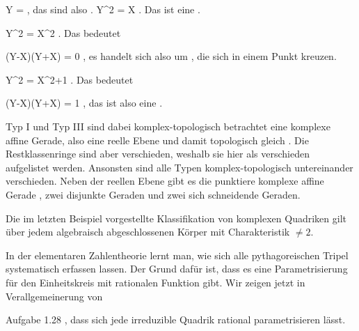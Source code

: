 {{\mavergleichskette
{\vergleichskette
{ Y
}
{ = }{ 
}
{  }{
}
{    }{
}
{   }{
}
}
{}{}{,}
das sind also  {.}
}{
\mavergleichskette
{\vergleichskette
{ Y^2
}
{ = }{ X
}
{  }{
}
{    }{
}
{   }{
}
}
{}{}{.}
Das ist eine  {.}
}{
\mavergleichskette
{\vergleichskette
{ Y^2
}
{ = }{ X^2
}
{  }{
}
{    }{
}
{   }{
}
}
{}{}{.}
Das bedeutet

\mavergleichskette
{\vergleichskette
{ (Y-X)(Y+X)
}
{ = }{ 0
}
{  }{
}
{    }{
}
{   }{
}
}
{}{}{,}
es handelt sich also um  {,} die sich in einem Punkt kreuzen.
}{
\mavergleichskette
{\vergleichskette
{ Y^2
}
{ = }{ X^2+1
}
{  }{
}
{    }{
}
{   }{
}
}
{}{}{.}
Das bedeutet

\mavergleichskette
{\vergleichskette
{ (Y-X)(Y+X)
}
{ = }{ 1
}
{  }{
}
{    }{
}
{   }{
}
}
{}{}{,}
das ist also eine  {.}
}
Typ I und Typ III sind dabei komplex-topologisch betrachtet eine komplexe affine Gerade, also eine reelle Ebene und damit topologisch gleich
 {} {.}
Die Restklassenringe sind aber verschieden, weshalb sie hier als verschieden aufgelistet werden. Ansonsten sind alle Typen komplex-topologisch untereinander verschieden. Neben der reellen Ebene gibt es die punktiere komplexe affine Gerade
 {} {,}
zwei disjunkte Geraden und zwei sich
 {} {}
schneidende Geraden.





}

Die im letzten Beispiel vorgestellte Klassifikation von komplexen Quadriken gilt über jedem algebraisch abgeschlossenen Körper mit Charakteristik $\neq 2$.






In der elementaren Zahlentheorie lernt man, wie sich alle pythagoreischen Tripel systematisch erfassen lassen. Der Grund dafür ist, dass es eine Parametrisierung für den Einheitskreis mit rationalen Funktion gibt. Wir zeigen jetzt in Verallgemeinerung von

Aufgabe 1.28
,
dass sich jede irreduzible Quadrik rational parametrisieren lässt.





